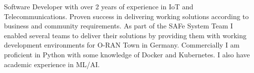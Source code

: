 

\begin{cvparagraph}

Software Developer with over 2 years of experience in IoT and Telecommunications. Proven success in delivering working solutions according to business and community requirements. As part of the SAFe System Team I enabled several teams to deliver their solutions by providing them with working development environments for O-RAN Town in Germany. Commercially I am proficient in Python with some knowledge of Docker and Kubernetes. I also have academic experience in ML/AI.
\end{cvparagraph}